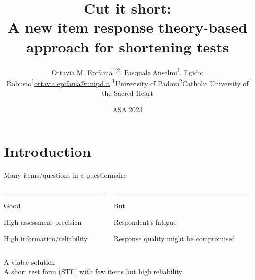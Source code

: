 \documentclass{beamer} %
\title[Cut it short]{Cut it short: \\ A new item response theory-based approach for shortening tests}
\date[ASA 2023]{ASA 2023}
\institute[]{September 7\textsuperscript{th}, Bologna (IT)}
\author[O.M.E., P.A., E.R.]{\texorpdfstring{Ottavia M. Epifania\textsuperscript{1,2}, Pasquale Anselmi\textsuperscript{1}, Egidio Robusto\textsuperscript{1}\newline\url{ottavia.epifania@unipd.it} \newline \textsuperscript{1}Univerisity of  Padova\newline\textsuperscript{2}Catholic University of the Sacred Heart}{Author}}
\begin{document}
	
\begin{frame}[plain]
	\maketitle
\end{frame}

\section[Intro]{Introduction}

\begin{frame}
	\begin{center}
	\Large	Many items/questions in a questionnaire 
\end{center}
\vspace{5mm}
\begin{columns}[T] %
	\begin{column}{.50\textwidth}
		\color{myGreen}\rule{\linewidth}{4pt}
		\begin{center}
			\large{Good}
		\end{center}
		\normalcolor
		
		High assessment precision
		
		
		\vspace{1.8mm}
		
		High information/reliability 
		
	\end{column}%
	\hfill%
	\begin{column}{.50\textwidth}
		
		\color{but}\rule{\linewidth}{4pt}
		\begin{center}
			\large{But}
		\end{center}
		\normalcolor
		
		Respondent's fatigue
		
		\vspace{1.8mm}
		
		Response quality might be compromised
		\end{column}%
\end{columns}  

\vspace{5mm}
\begin{center}
	\color{template} A viable solution \\
	\normalcolor 
	A short test form (STF) with few items but high reliability 
\end{center}

\end{frame}
\end{document}
